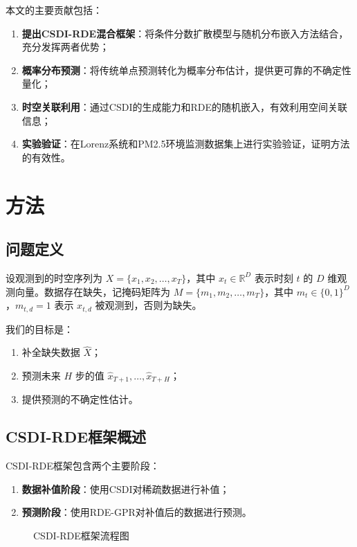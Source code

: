 \documentclass[12pt,a4paper]{article}
\begin{document}
本文的主要贡献包括：
\begin{enumerate}
    \item \textbf{提出CSDI-RDE混合框架}：将条件分数扩散模型与随机分布嵌入方法结合，充分发挥两者优势；
    \item \textbf{概率分布预测}：将传统单点预测转化为概率分布估计，提供更可靠的不确定性量化；
    \item \textbf{时空关联利用}：通过CSDI的生成能力和RDE的随机嵌入，有效利用空间关联信息；
    \item \textbf{实验验证}：在Lorenz系统和PM2.5环境监测数据集上进行实验验证，证明方法的有效性。
\end{enumerate}

\section{方法}

\subsection{问题定义}

设观测到的时空序列为 $X=\{x_1,x_2,\dots,x_T\}$，其中 $x_t\in\mathbb{R}^D$ 表示时刻 $t$ 的 $D$ 维观测向量。数据存在缺失，记掩码矩阵为 $M=\{m_1,m_2,\dots,m_T\}$，其中 $m_t\in\{0,1\}^D$，$m_{t,d}=1$ 表示 $x_{t,d}$ 被观测到，否则为缺失。

我们的目标是：
\begin{enumerate}
    \item 补全缺失数据 $\hat{X}$；
    \item 预测未来 $H$ 步的值 $\hat{x}_{T+1},\dots,\hat{x}_{T+H}$；
    \item 提供预测的不确定性估计。
\end{enumerate}

\subsection{CSDI-RDE框架概述}

CSDI-RDE框架包含两个主要阶段：
\begin{enumerate}
    \item \textbf{数据补值阶段}：使用CSDI对稀疏数据进行补值；
    \item \textbf{预测阶段}：使用RDE-GPR对补值后的数据进行预测。
\end{enumerate}

\begin{figure}[H]
    \centering
    \caption{CSDI-RDE框架流程图}
    \label{fig:framework}
\end{figure}
\end{document}
